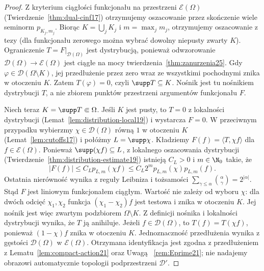 \begin{proof}
Z kryterium ciągłości funkcjonału na przestrzeni
$\mathcal E(\Omega)$ (Twierdzenie~\ref{thm:dual-cinf17})
otrzymujemy oszacowanie przez skończenie wiele
seminorm $p_{K_j,m_j}$. Biorąc $K=\bigcup_jK_j$
i $m=\max_jm_j$, otrzymujemy oszacowanie z tezy
(dla funkcjonału zerowego można wybrać dowolny
niepusty zwarty $K$). Ograniczenie
$T=F|_{\mathcal D(\Omega)}$ jest dystrybucją, ponieważ
odwzorowanie $\mathcal D(\Omega)\to\mathcal E(\Omega)$
jest ciągłe na mocy twierdzenia~\ref{thm:zanurzenia25}. Gdy
$\varphi\in\mathcal D(\Omega\setminus K)$, jej
przedłużenie przez zero wraz ze wszystkimi pochodnymi
znika w otoczeniu $K$. Zatem $T(\varphi)=0$,
czyli $\supp T\subseteq K$.
Nośnik jest tu nośnikiem dystrybucji $T$,
a nie zbiorem punktów przestrzeni argumentów funkcjonału $F$.

Niech teraz $K=\supp T\Subset\Omega$. Jeśli $K$ jest
pusty, to $T=0$ z lokalności dystrybucji
(Lemat~\ref{lem:distribution-local19}) i wystarcza $F=0$.
W przeciwnym przypadku wybierzmy
$\chi\in\mathcal D(\Omega)$ równą $1$ w otoczeniu $K$
(Lemat~\ref{lem:cutoffs17}) i połóżmy $L=\supp\chi$.
Kładziemy $F(f)=\langle T,\chi f\rangle$ dla
$f\in\mathcal E(\Omega)$. Ponieważ $\supp(\chi f)\subseteq L$,
z lokalnego oszacowania dystrybucji
(Twierdzenie~\ref{thm:distribution-estimate19})
istnieją $C_L>0$ i $m\in\N_0$ takie, że
\[
 |F(f)|\le C_L p_{L,m}(\chi f)
 \le C_L 2^m p_{L,m}(\chi)p_{L,m}(f).
\]
Ostatnia nierówność wynika z reguły Leibniza i tożsamości
$\sum_{\gamma\le\alpha}\binom{\alpha}{\gamma}=2^{|\alpha|}$.
Stąd $F$ jest liniowym funkcjonałem ciągłym.
Wartość nie zależy od wyboru $\chi$: dla dwóch odcięć
$\chi_1,\chi_2$ funkcja $(\chi_1-\chi_2)f$ jest testowa
i znika w otoczeniu $K$. Jej nośnik jest więc zwartym
podzbiorem $\Omega\setminus K$. Z definicji nośnika
i lokalności dystrybucji wynika, że $T$ ją anihiluje. Jeżeli $f\in\mathcal D(\Omega)$, to
$T(f)=T(\chi f)$, ponieważ $(1-\chi)f$ znika w
otoczeniu $K$. Jednoznaczność przedłużenia wynika
z gęstości $\mathcal D(\Omega)$ w $\mathcal E(\Omega)$.
Otrzymana identyfikacja jest zgodna z przedłużeniem
z Lematu~\ref{lem:compact-action21} oraz Uwagą~
\ref{rem:Eprime21}; nie nadajemy obrazowi automatycznie
topologii podprzestrzeni $\mathcal D'$.
\end{proof}
